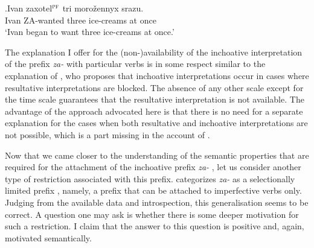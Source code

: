 \exg.\label{ex:zaxotet}Ivan zaxotel$^{\textsc{pf}}$ tri moro\v{z}ennyx srazu.\\
Ivan ZA-wanted three ice-creams {at once}\\
\trans `Ivan began to want three ice-creams at once.'
\\

The explanation I offer for the (non-)availability of the inchoative  interpretation of the prefix \textit{za-}   with particular verbs is in some respect similar to the explanation of \citet{Braginsky:08}, who proposes that inchoative  interpretations occur in cases where resultative  interpretations are blocked. The absence of any other scale except for the time scale guarantees that the resultative  interpretation is not available. The advantage of the approach advocated here is that there is no need for a separate explanation for the cases when both resultative  and inchoative  interpretations are not possible, which is a part missing in the account of \citet{Braginsky:08}.

Now that we came closer to the understanding of the semantic properties that are required for the attachment of the inchoative  prefix \textit{za-}  , let us consider another type of restriction associated with this prefix. \citet{Tatevosov:09} categorizes \textit{za-}   as a selectionally limited prefix , namely, a prefix that can be attached to imperfective verbs  only. Judging from the available data and introspection, this generalisation seems to be correct. A question one may ask is whether there is some deeper motivation for such a restriction. I claim that the answer to this question is positive and, again, motivated semantically. 

